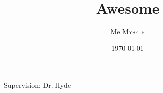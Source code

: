 \documentclass[a4paper]{beamer}
\title{Awesome}
\author{Me \textsc{Myself}}
\date{\today}
\institute{Lab}
\begin{document}
\begin{frame}
\titlepage

\vfill

\begin{center}
    Supervision: Dr. Hyde
\end{center}

\end{frame}

\end{document}
